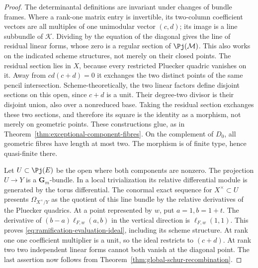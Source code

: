 \begin{proof}
The determinantal definitions are invariant under changes of bundle
frames.  Where a rank-one matrix entry is invertible, its two-column
coefficient vectors are all multiples of one unimodular vector
\((c,d)\); its image is a line subbundle of \(\mathcal K\).
Dividing by the equation of the diagonal gives the line of residual
linear forms, whose zero is a regular section of
\(\Pj(\mathcal M)\).  This also works on the indicated
scheme structures, not merely on their closed points.  The residual
section lies in \(X\), because every restricted Pluecker quadric
vanishes on it.  Away from \(cd(c+d)=0\) it exchanges the two
distinct points of the same pencil intersection.  Scheme-theoretically,
the two linear factors define disjoint sections on this open, since
\(c+d\) is a unit.  Their degree-two divisor is their disjoint
union, also over a nonreduced base.  Taking the residual section
exchanges these two sections, and therefore its square is the
identity as a morphism, not merely on geometric points.  These
constructions glue, as in
Theorem~\ref{thm:exceptional-component-fibres}.  On the complement
of \(D_0\), all geometric fibres have length at most two.  The
morphism is of finite type, hence quasi-finite there.

Let \(U\subset\Pj(E)\) be the open where both components
are nonzero.  The projection \(U\to Y\) is a
\(\mathbf G_m\)-bundle.  In a local trivialization its relative
differential module is generated by the torus differential.  The
conormal exact sequence for \(X^\times\subset U\) presents
\(\Omega_{X^\times/Y}\) as the quotient of this line bundle
by the relative derivatives of the Pluecker quadrics.  At a point
represented by \(w\), put \(a=1,b=1+t\).  The derivative of
\((b-a)\ell_{F,w}(a,b)\) in the vertical direction is
\(\ell_{F,w}(1,1)\).  This proves
\eqref{eq:ramification-evaluation-ideal}, including its scheme
structure.  At rank one one coefficient multiplier is a unit, so the
ideal restricts to \((c+d)\).  At rank two two independent linear
forms cannot both vanish at the diagonal point.  The last assertion
now follows from Theorem~\ref{thm:global-schur-recombination}.
\end{proof}

